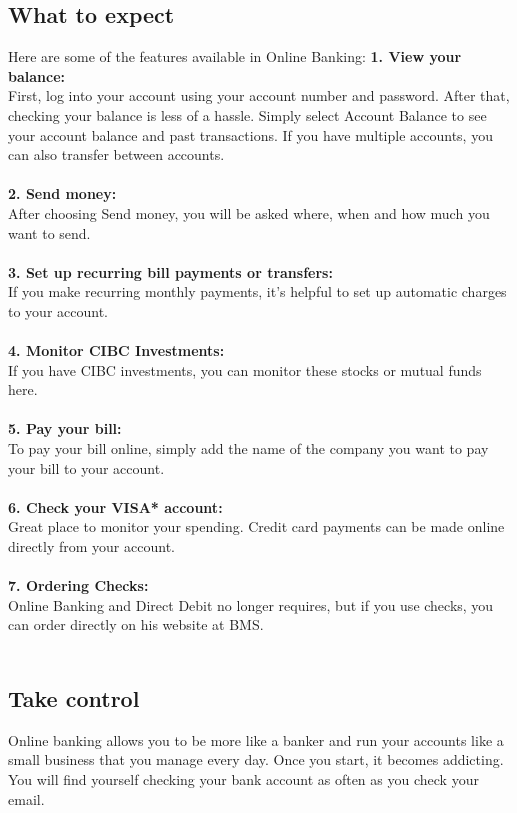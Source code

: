 \documentclass{article}
\begin{document}
\subsection{What to expect}
Here are some of the features available in Online Banking:
\textbf{1. View your balance:}\\
First, log into your account using your account number and password. After that, checking your balance is less of a hassle. Simply select Account Balance to see your account balance and past transactions. If you have multiple accounts, you can also transfer between accounts.
\\\\
\textbf{2. Send money:}\\
After choosing Send money, you will be asked where, when and how much you want to send.\\\\
\textbf{3. Set up recurring bill payments or transfers:}\\
If you make recurring monthly payments, it's helpful to set up automatic charges to your account.\\\\
\textbf{4. Monitor CIBC Investments:}\\
If you have CIBC investments, you can monitor these stocks or mutual funds here. \\\\
\textbf{5. Pay your bill:}\\
To pay your bill online, simply add the name of the company you want to pay your bill to your account.\\\\
\textbf{6. Check your VISA* account:}\\
Great place to monitor your spending. Credit card payments can be made online directly from your account.\\\\
\textbf{7. Ordering Checks:}\\
Online Banking and Direct Debit no longer requires, but if you use checks, you can order directly on his website at BMS.\\\\
\newpage
\subsection{Take control}
Online banking allows you to be more like a banker and run your accounts like a small business that you manage every day. Once you start, it becomes addicting. You will find yourself checking your bank account as often as you check your email.
\end{document}
